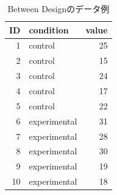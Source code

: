 \begin{table}[ht]
	\centering
	\caption{Between Designのデータ例}
	\begin{tabular}{rlr}
		\hline
		ID & condition    & value \\
		\hline
		1  & control      & 25    \\
		2  & control      & 15    \\
		3  & control      & 24    \\
		4  & control      & 17    \\
		5  & control      & 22    \\
		6  & experimental & 31    \\
		7  & experimental & 28    \\
		8  & experimental & 30    \\
		9  & experimental & 19    \\
		10 & experimental & 18    \\
		\hline
	\end{tabular}
	\label{tbl::19_02}
\end{table}
